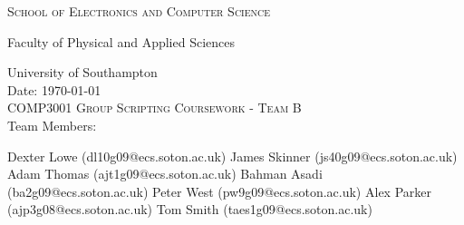 \begin{titlepage}
	
\begin{center}

\textsc{\large{School of Electronics and Computer Science}}

\large{Faculty of Physical and Applied Sciences}

\large{University of Southampton}\\[3.5cm]

\large{Date: \today}\\[4.0cm]

\textsc{\LARGE COMP3001 Group Scripting Coursework - Team B}\\[4.5cm] 

\large{Team Members:}

\large{Dexter Lowe (dl10g09@ecs.soton.ac.uk)}
\large{James Skinner (js40g09@ecs.soton.ac.uk)}
\large{Adam Thomas (ajt1g09@ecs.soton.ac.uk)}
\large{Bahman Asadi (ba2g09@ecs.soton.ac.uk)}
\large{Peter West (pw9g09@ecs.soton.ac.uk)}
\large{Alex Parker (ajp3g08@ecs.soton.ac.uk)}
\large{Tom Smith (taes1g09@ecs.soton.ac.uk)}

\vfill

\large{}
\end{center}

\end{titlepage}
